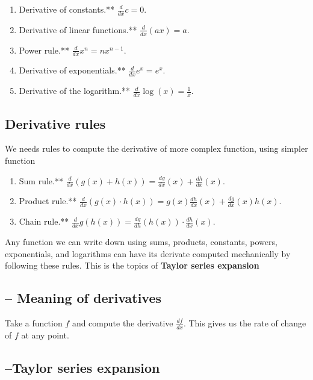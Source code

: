 \begin{enumerate}

\item Derivative of constants.** $\frac{d}{dx}c = 0$.
\item Derivative of linear functions.** $\frac{d}{dx}(ax) = a$.
\item Power rule.** $\frac{d}{dx}x^n = nx^{n-1}$.
\item Derivative of exponentials.** $\frac{d}{dx}e^x = e^x$.
\item Derivative of the logarithm.** $\frac{d}{dx}\log(x) = \frac{1}{x}$.
\end{enumerate}

\subsection{Derivative rules}

We needs rules to compute the derivative of more complex function, using simpler function

\begin{enumerate}

\item Sum rule.** $\frac{d}{dx}\left(g(x) + h(x)\right) = \frac{dg}{dx}(x) + \frac{dh}{dx}(x)$.
\item Product rule.** $\frac{d}{dx}\left(g(x)\cdot h(x)\right) = g(x)\frac{dh}{dx}(x) + \frac{dg}{dx}(x)h(x)$.
\item Chain rule.** $\frac{d}{dx}g(h(x)) = \frac{dg}{dh}(h(x))\cdot \frac{dh}{dx}(x)$.
\end{enumerate}

Any function we can write down using sums, products, constants, powers,
exponentials, and logarithms can have its derivate computed mechanically by
following these rules. This is the topics of {\bf Taylor series expansion}


\subsection{-- Meaning of derivatives}

Take a function $f$ and compute the derivative $\frac{df}{dx}$.  This gives us
the rate of change of $f$ at any point.



\subsection{--Taylor series expansion}

